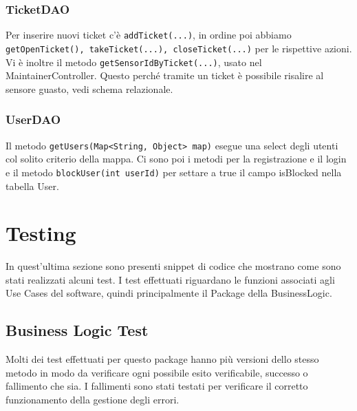 \documentclass[a4paper, 11pt]{article}
\begin{document}
	\subsubsection{TicketDAO}
	Per inserire nuovi ticket c'è \texttt{addTicket(...)}, in ordine poi abbiamo \texttt{getOpenTicket(), takeTicket(...), closeTicket(...)} per le rispettive azioni. Vi è inoltre il metodo \texttt{getSensorIdByTicket(...)}, usato nel MaintainerController. Questo perché tramite un ticket è possibile risalire al sensore guasto, vedi schema relazionale.
	\subsubsection{UserDAO}
	Il metodo \texttt{getUsers(Map<String, Object> map)} esegue una select degli utenti col solito criterio della mappa. Ci sono poi i metodi per la registrazione e il login e il metodo \texttt{blockUser(int userId)} per settare a true il campo isBlocked nella tabella User.

	\section{Testing}
	In quest'ultima sezione sono presenti snippet di codice che mostrano come sono stati realizzati alcuni test. I test effettuati riguardano le funzioni associati agli Use Cases del software, quindi principalmente il Package della BusinessLogic.
	\subsection{Business Logic Test}
	Molti dei test effettuati per questo package hanno più versioni dello stesso metodo in modo da verificare ogni possibile esito verificabile, successo o fallimento che sia. I fallimenti sono stati testati per verificare il corretto funzionamento della gestione degli errori.
\end{document}
